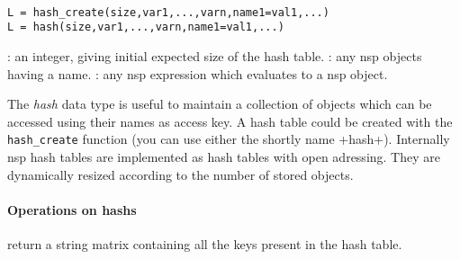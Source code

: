
\begin{mandesc}
   \\
\end{mandesc}

\begin{calling_sequence}
\begin{verbatim}
L = hash_create(size,var1,...,varn,name1=val1,...)
L = hash(size,var1,...,varn,name1=val1,...)
\end{verbatim}
\end{calling_sequence}
\begin{parameters}
  \begin{varlist}
    : an integer, giving initial expected size of the hash table.
    :  any nsp objects having a name. 
    : any nsp expression which evaluates to a nsp object.
  \end{varlist}
\end{parameters}

\begin{mandescription}
The \emph{hash} data type is useful to maintain a collection of objects 
which can be accessed using their names as access key. A hash table
could be created with the \verb+hash_create+ function (you can use
either the shortly name +hash+).  
Internally nsp hash tables are implemented as hash tables with open adressing. 
They are dynamically resized according to the number of stored
objects.

\end{mandescription}

\paragraph{Operations on hashs}
  \begin{varlist}
     return a string matrix containing all the keys present in the hash 
    table.
  \end{varlist}

